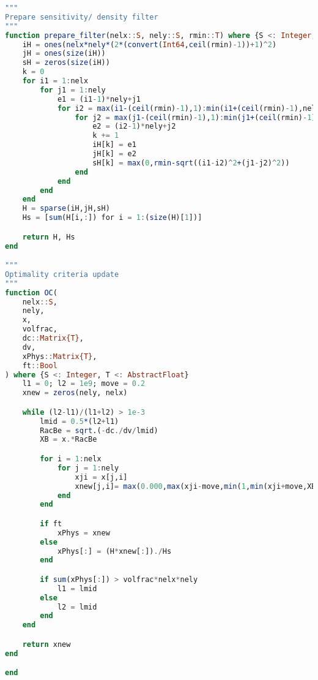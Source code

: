 \begin{lstlisting}[language=Julia, title=\texttt{top88.jl}]
"""
Prepare sensitivity/ density filter
"""
function prepare_filter(nelx::S, nely::S, rmin::T) where {S <: Integer, T <: AbstractFloat}
    iH = ones(nelx*nely*(2*(convert(Int64,ceil(rmin)-1))+1)^2)
    jH = ones(size(iH))
    sH = zeros(size(iH))
    k = 0
    for i1 = 1:nelx
        for j1 = 1:nely
            e1 = (i1-1)*nely+j1
            for i2 = max(i1-(ceil(rmin)-1),1):min(i1+(ceil(rmin)-1),nelx)
                for j2 = max(j1-(ceil(rmin)-1),1):min(j1+(ceil(rmin)-1),nely)
                    e2 = (i2-1)*nely+j2
                    k += 1
                    iH[k] = e1
                    jH[k] = e2
                    sH[k] = max(0,rmin-sqrt((i1-i2)^2+(j1-j2)^2))
                end
            end
        end
    end
    H = sparse(iH,jH,sH)
    Hs = [sum(H[i,:]) for i = 1:(size(H)[1])]

    return H, Hs
end

"""
Optimality criteria update
"""
function OC(
    nelx::S,
    nely,
    x,
    volfrac,
    dc::Matrix{T},
    dv,
    xPhys::Matrix{T},
    ft::Bool
) where {S <: Integer, T <: AbstractFloat}
    l1 = 0; l2 = 1e9; move = 0.2
    xnew = zeros(nely, nelx)

    while (l2-l1)/(l1+l2) > 1e-3
        lmid = 0.5*(l2+l1)
        RacBe = sqrt.(-dc./dv/lmid)
        XB = x.*RacBe

        for i = 1:nelx
            for j = 1:nely
                xji = x[j,i]
                xnew[j,i]= max(0.000,max(xji-move,min(1,min(xji+move,XB[j,i]))))
            end
        end  

        if ft
            xPhys = xnew
        else
            xPhys[:] = (H*xnew[:])./Hs
        end

        if sum(xPhys[:]) > volfrac*nelx*nely
            l1 = lmid
        else 
            l2 = lmid 
        end
    end

    return xnew
end

end 
\end{lstlisting}

